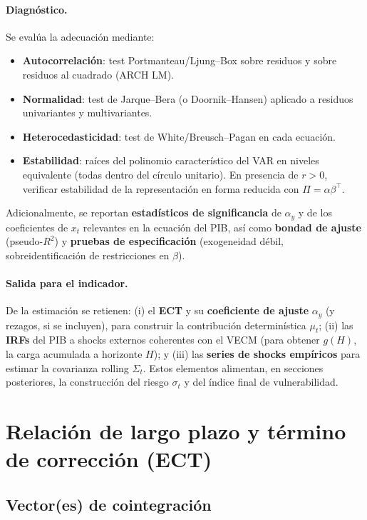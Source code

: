 \documentclass[11pt,a4paper]{article}
\newcommand{\1}{\mathbf{1}}
\begin{document}
\paragraph{Diagnóstico.}
Se evalúa la adecuación mediante:
\begin{itemize}
  \item \textbf{Autocorrelación}: test Portmanteau/Ljung--Box sobre residuos y sobre residuos al cuadrado (ARCH LM).
  \item \textbf{Normalidad}: test de Jarque--Bera (o Doornik--Hansen) aplicado a residuos univariantes y multivariantes.
  \item \textbf{Heterocedasticidad}: test de White/Breusch--Pagan en cada ecuación.
  \item \textbf{Estabilidad}: raíces del polinomio característico del VAR en niveles equivalente (todas dentro del círculo unitario). En presencia de $r>0$, verificar estabilidad de la representación en forma reducida con $\Pi=\alpha\beta^\top$.
\end{itemize}
Adicionalmente, se reportan \textbf{estadísticos de significancia} de $\alpha_y$ y de los coeficientes de $x_t$ relevantes en la ecuación del PIB, así como \textbf{bondad de ajuste} (pseudo-$R^2$) y \textbf{pruebas de especificación} (exogeneidad débil, sobreidentificación de restricciones en $\beta$).

\paragraph{Salida para el indicador.}
De la estimación se retienen: (i) el \textbf{ECT} y su \textbf{coeficiente de ajuste} $\alpha_y$ (y rezagos, si se incluyen), para construir la contribución determinística $\mu_t$; (ii) las \textbf{IRFs} del PIB a shocks externos coherentes con el VECM (para obtener $g(H)$, la carga acumulada a horizonte $H$); y (iii) las \textbf{series de shocks empíricos} para estimar la covarianza rolling $\Sigma_t$. Estos elementos alimentan, en secciones posteriores, la construcción del riesgo $\sigma_t$ y del índice final de vulnerabilidad.
\section{Relación de largo plazo y término de corrección (ECT)}

\subsection{Vector(es) de cointegración}
\end{document}

